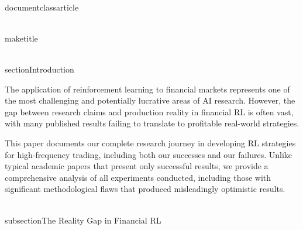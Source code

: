 \\documentclass{article}
\begin{document}
\\maketitle
\n\n
\begin{abstract}
This paper presents the complete research journey of developing reinforcement learning strategies for high-frequency trading, documenting both the successes and failures encountered across 157 experiments conducted over several months. Our journey reveals a critical insight: only 14 experiments (8.9%
\end{abstract}
\n\n
\\section{Introduction}

The application of reinforcement learning to financial markets represents one of the most challenging and potentially lucrative areas of AI research. However, the gap between research claims and production reality in financial RL is often vast, with many published results failing to translate to profitable real-world strategies.

This paper documents our complete research journey in developing RL strategies for high-frequency trading, including both our successes and our failures. Unlike typical academic papers that present only successful results, we provide a comprehensive analysis of all experiments conducted, including those with significant methodological flaws that produced misleadingly optimistic results.

\\subsection{The Reality Gap in Financial RL}
\end{document}
